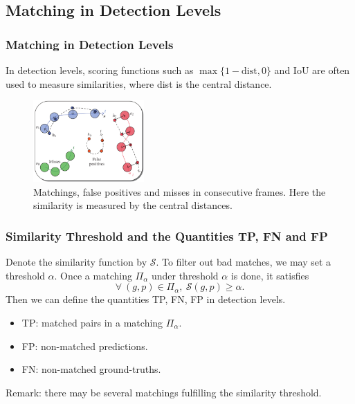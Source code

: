 \documentclass[slidetop, mathserif]{beamer}
\begin{document}
\subsection{Matching in Detection Levels}

\begin{frame}
	\frametitle{Matching in Detection Levels}
	
	In detection levels, scoring functions such as $\max\{1-\text{dist}, 0\}$ and IoU
	are often used to measure similarities, where dist is the central distance.
	
	\begin{figure}
		\includegraphics[width=120pt]{pics/fig2.png}
		\caption{Matchings, false positives and misses in consecutive frames.
			Here the similarity is measured by the central distances.}
	\end{figure}
	
\end{frame}

\begin{frame}
	\frametitle{Similarity Threshold and the Quantities TP, FN and FP}

	Denote the similarity function by $\mathcal S$.
	To filter out bad matches, we may set a threshold $\alpha$.
	Once a matching $\Pi_\alpha$ under threshold $\alpha$ is done, it satisfies
	\[
			\forall\ (g,p)\in\Pi_\alpha, ~ \mathcal S(g,p) \geq \alpha.
	\]
	Then we can define the quantities TP, FN, FP in detection levels.
	\begin{itemize}
	\item TP: matched pairs in a matching $\Pi_\alpha$.
	\item FP: non-matched predictions.
	\item FN: non-matched ground-truths.
	\end{itemize}
	Remark: there may be several matchings fulfilling the similarity threshold.
\end{frame}
\end{document}
